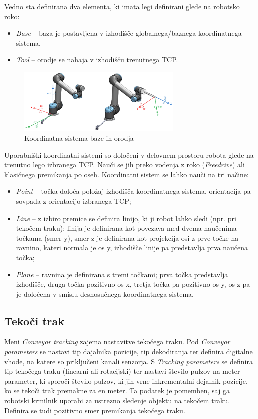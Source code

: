Vedno sta definirana dva elementa, ki imata legi definirani glede na robotsko roko:
\begin{itemize}
  \item \emph{Base} -- baza je postavljena v izhodišče globalnega/baznega koordinatnega sistema,
  \item \emph{Tool} -- orodje se nahaja v izhodišču trenutnega TCP.
\end{itemize}


\begin{figure}[!hbt]
\centering
\includegraphics[width=0.7\textwidth]{ur5e_feat.eps}
\caption{Koordinatna sistema baze in orodja}
\label{fig:ur_feat}
\end{figure}

Uporabniški koordinatni sistemi so določeni v delovnem prostoru robota glede na trenutno lego izbranega TCP. Nauči se jih preko vodenja z roko (\emph{Freedrive}) ali klasičnega premikanja po oseh. Koordinatni sistem se lahko nauči na tri načine:
\begin{itemize}
    \item \emph{Point} -- točka določa položaj izhodišča koordinatnega sistema, orientacija pa sovpada z orientacijo izbranega TCP;
    \item \emph{Line} -- z izbiro premice se definira linijo, ki ji robot lahko sledi (npr. pri tekočem traku); linija je definirana kot povezava med dvema naučenima točkama (smer y), smer z je definirana kot projekcija osi z prve točke na ravnino, kateri normala je os y, izhodišče linije pa predstavlja prva naučena točka;
    \item \emph{Plane} -- ravnina je definirana s tremi točkami; prva točka predstavlja izhodišče, druga točka pozitivno os x, tretja točka pa pozitivno os y, os z pa je določena v smislu desnosučnega koordinatnega sistema.
\end{itemize}

\subsection{Tekoči trak}

Meni \emph{Conveyor tracking} zajema nastavitve tekočega traku. Pod \emph{Conveyor parameters} se nastavi tip dajalnika pozicije, tip dekodiranja ter definira digitalne vhode, na katere so priključeni kanali senzorja. S \emph{Tracking parameters} se definira tip tekočega traku (linearni ali rotacijski) ter nastavi število pulzov na meter -- parameter, ki sporoči število pulzov, ki jih vrne inkrementalni dejalnik pozicije, ko se tekoči trak premakne za en meter. Ta podatek je pomemben, saj ga robotski krmilnik uporabi za ustrezno sledenje objektu na tekočem traku. Definira se tudi pozitivno smer premikanja tekočega traku.


